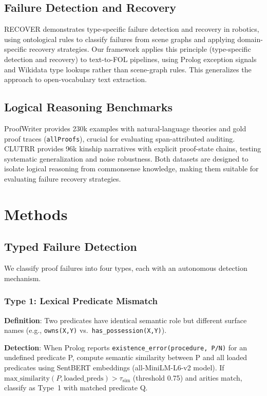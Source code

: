 \documentclass[11pt,letterpaper]{article}
\begin{document}
\subsection{Failure Detection and Recovery}

RECOVER \citep{Cornelio2024} demonstrates type-specific failure detection and recovery in robotics, using ontological rules to classify failures from scene graphs and applying domain-specific recovery strategies. Our framework applies this principle (type-specific detection and recovery) to text-to-FOL pipelines, using Prolog exception signals and Wikidata type lookups rather than scene-graph rules. This generalizes the approach to open-vocabulary text extraction.

\subsection{Logical Reasoning Benchmarks}

ProofWriter \citep{Tafjord2021} provides 230k examples with natural-language theories and gold proof traces (\texttt{allProofs}), crucial for evaluating span-attributed auditing. CLUTRR \citep{Sinha2019} provides 96k kinship narratives with explicit proof-state chains, testing systematic generalization and noise robustness. Both datasets are designed to isolate logical reasoning from commonsense knowledge, making them suitable for evaluating failure recovery strategies.

\section{Methods}
\label{sec:methods}

\subsection{Typed Failure Detection}

We classify proof failures into four types, each with an autonomous detection mechanism.

\subsubsection{Type 1: Lexical Predicate Mismatch}

\textbf{Definition}: Two predicates have identical semantic role but different surface names (e.g., \texttt{owns(X,Y)} vs.\ \texttt{has\_possession(X,Y)}).

\textbf{Detection}: When Prolog reports \texttt{existence\_error(procedure, P/N)} for an undefined predicate P, compute semantic similarity between P and all loaded predicates using SentBERT embeddings \citep{Reimers2019} (all-MiniLM-L6-v2 model). If $\mathrm{max\_similarity}(P, \text{loaded\_preds}) > \tau_{\text{sim}}$ (threshold 0.75) and arities match, classify as Type~1 with matched predicate Q.
\end{document}
